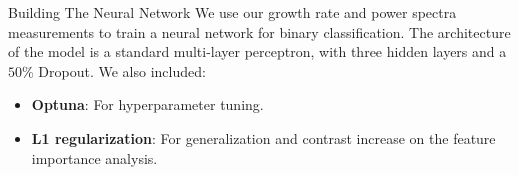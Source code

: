 \begin{block}{Building The Neural Network}
  We use our growth rate and power spectra measurements to train a neural network for binary classification. The architecture of the model is a standard multi-layer perceptron, with three hidden layers and a $50\%$ Dropout. We also included:

  \begin{itemize}
    \item \textbf{Optuna}: For hyperparameter tuning.
    \item \textbf{L1 regularization}: For generalization and contrast increase on the feature importance analysis.
  \end{itemize}
\end{block}